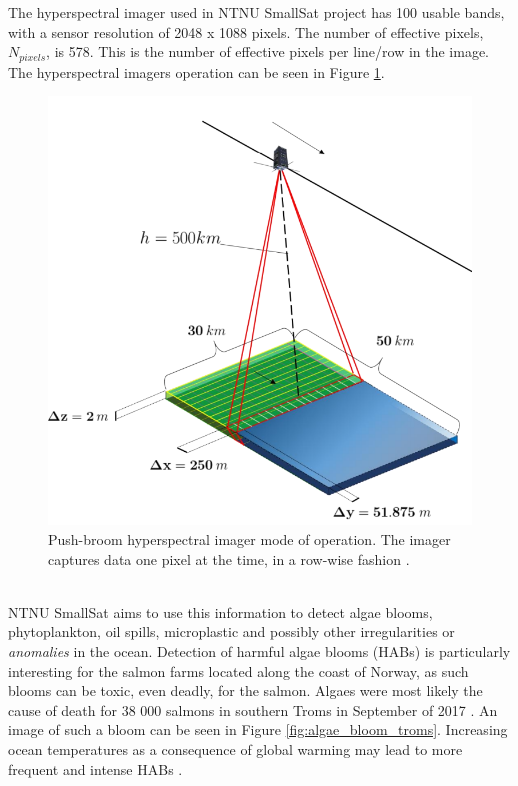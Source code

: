The hyperspectral imager used in NTNU SmallSat project has 100 usable bands, with a sensor resolution of 2048 x 1088 pixels. The number of effective pixels, $N_{pixels}$, is 578. This is the number of effective pixels per line/row in the image. The hyperspectral imagers operation can be seen in Figure \ref{fig:HSI_functionality}. 
\begin{figure}[H]
\centering
   \includegraphics[scale=0.3]{images/hyperspectral_imager.PNG}
  \caption{ Push-broom hyperspectral imager mode of operation. The imager captures data one pixel at the time, in a row-wise fashion \cite{SmallSat_project_description}. } 
  \label{fig:HSI_functionality}
\end{figure}
\\

NTNU SmallSat aims to use this information to detect algae blooms, phytoplankton, oil spills, microplastic and possibly other irregularities or \textit{anomalies} in the ocean. Detection of harmful algae blooms (HABs) is particularly interesting for the salmon farms located along the coast of Norway, as such blooms can be toxic, even deadly, for the salmon. Algaes were most likely the cause of death for 38 000 salmons in southern Troms in September of 2017 \cite{laksedeath}. An image of such a bloom can be seen in Figure \ref{fig:algae_bloom_troms}. Increasing ocean temperatures as a consequence of global warming may lead to more frequent and intense HABs \cite{climate_change_algae_blooms}. 
\\

